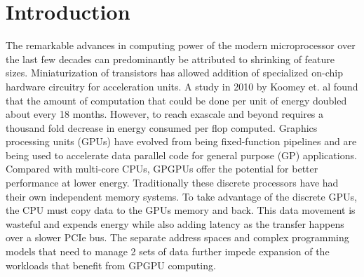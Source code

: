 \section{Introduction}\label{introduction}



\par The remarkable advances in computing power of the modern microprocessor over the last few decades can predominantly be attributed to shrinking of feature sizes. Miniaturization of transistors has allowed addition of specialized on-chip hardware circuitry for acceleration units. 
A study in 2010 by Koomey et. al \cite{koomey} found that the amount of computation that could be done per unit of energy doubled about every 18 months. However, to reach exascale and beyond requires a thousand fold decrease in energy consumed per flop computed. Graphics processing units (GPUs) have evolved from being fixed-function pipelines and are being used to accelerate data parallel code for general purpose (GP) applications. Compared with multi-core CPUs, GPGPUs offer the potential for better performance at lower energy. Traditionally these discrete processors have had their own independent memory systems. To take advantage of the discrete GPUs, the CPU must copy data to the GPUs memory and back. This data movement is wasteful and expends energy while also adding latency as the transfer happens over a slower PCIe bus. The separate address spaces and complex programming models that need to manage 2 sets of data further impede expansion of the workloads that benefit from GPGPU computing. 

